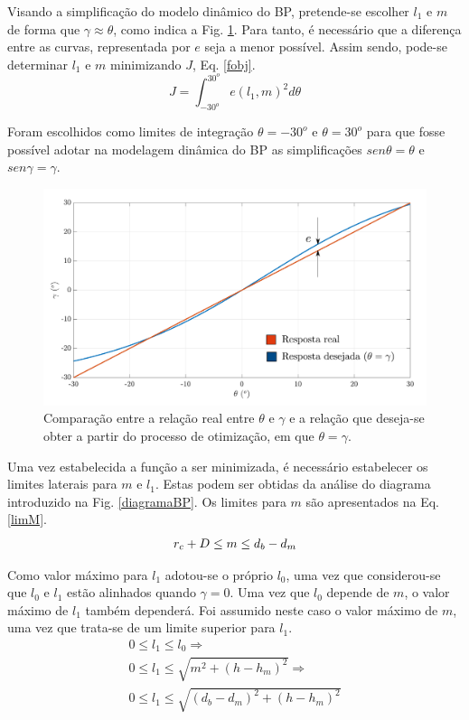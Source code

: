 \documentclass[12pt]{article}
\begin{document}
	Visando a simplificação do modelo dinâmico do BP, pretende-se escolher $ l_1 $ e $ m $ de forma que $ \gamma \approx \theta $, como indica a Fig. \ref{respostaOtm}. Para tanto, é necessário que a diferença entre as curvas, representada por $ e $ seja a menor possível. Assim sendo, pode-se determinar $ l_1 $ e $ m $ minimizando $ J $, Eq. \ref{fobj}.
	\begin{equation}
		\label{fobj}
		J = \int_{-30^o}^{30^o} e(l_1, m)^2 d\theta
	\end{equation} 

	Foram escolhidos como limites de integração $ \theta = -30^o $ e $ \theta = 30^o $ para que fosse possível adotar na modelagem dinâmica do BP as simplificações $ sen \theta = \theta $ e $ sen \gamma = \gamma $. 
	\begin{figure}[H]
		\centering
		\includegraphics[width=\linewidth]{figuras/respostaOtm.pdf}
		\caption{Comparação entre a relação real entre $ \theta $ e $ \gamma $ e a relação que deseja-se obter a partir do processo de otimização, em que $ \theta = \gamma $.}
		\label{respostaOtm}
	\end{figure}

	Uma vez estabelecida a função a ser minimizada, é necessário estabelecer os limites laterais para $ m $ e $ l_1 $. Estas podem ser obtidas da análise do diagrama introduzido na Fig. \ref{diagramaBP}. Os limites para $ m $ são apresentados na Eq. \ref{limM}.
 	\begin{equation}
 		\label{limM}
	 	r_c + D \leq m \leq d_b - d_m \\
 	\end{equation}
 	
 	Como valor máximo para $ l_1 $ adotou-se o próprio $ l_0 $, uma vez que considerou-se que $ l_0 $ e $ l_1 $ estão alinhados quando $ \gamma = 0 $. Uma vez que $ l_0 $ depende de $ m $, o valor máximo de $ l_1 $ também dependerá. Foi assumido neste caso o valor máximo de $ m $, uma vez que trata-se de um limite superior para $ l_1 $.
 	\begin{gather}
 		0 \leq l_1 \leq l_0 \Rightarrow \nonumber\\
 		0 \leq l_1 \leq \sqrt{m^2 + (h - h_m)^2} \Rightarrow \nonumber\\
 		0 \leq l_1 \leq \sqrt{(d_b - d_m)^2 + (h - h_m)^2} 
 	\end{gather}
 	
\end{document}
